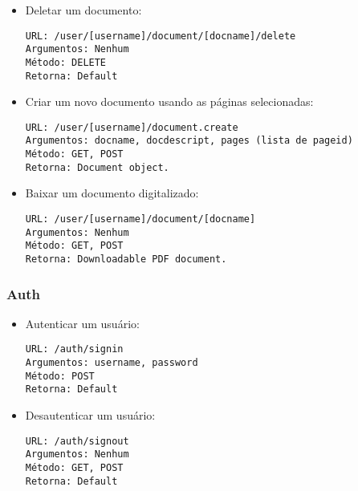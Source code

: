 \begin{itemize}
\item Deletar um documento: 
\begin{verbatim}
URL: /user/[username]/document/[docname]/delete
Argumentos: Nenhum
Método: DELETE
Retorna: Default 
\end{verbatim}

\item Criar um novo documento usando as páginas selecionadas:
\begin{verbatim}
URL: /user/[username]/document.create
Argumentos: docname, docdescript, pages (lista de pageid)
Método: GET, POST
Retorna: Document object.
\end{verbatim}

\item Baixar um documento digitalizado:
\begin{verbatim}
URL: /user/[username]/document/[docname]
Argumentos: Nenhum
Método: GET, POST
Retorna: Downloadable PDF document.
\end{verbatim}

\end{itemize}

\subsubsection{Auth}

\begin{itemize}

\item Autenticar um usuário:
\begin{verbatim}
URL: /auth/signin
Argumentos: username, password
Método: POST
Retorna: Default
\end{verbatim}

\item Desautenticar um usuário:
\begin{verbatim}
URL: /auth/signout
Argumentos: Nenhum
Método: GET, POST
Retorna: Default
\end{verbatim} 

\end{itemize}
